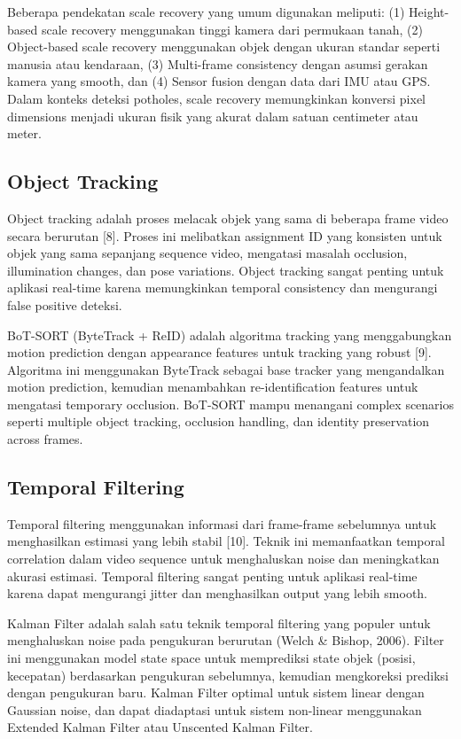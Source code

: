 \documentclass[12pt,a4paper]{report}
\begin{document}
Beberapa pendekatan scale recovery yang umum digunakan meliputi: (1) Height-based scale recovery menggunakan tinggi kamera dari permukaan tanah, (2) Object-based scale recovery menggunakan objek dengan ukuran standar seperti manusia atau kendaraan, (3) Multi-frame consistency dengan asumsi gerakan kamera yang smooth, dan (4) Sensor fusion dengan data dari IMU atau GPS. Dalam konteks deteksi potholes, scale recovery memungkinkan konversi pixel dimensions menjadi ukuran fisik yang akurat dalam satuan centimeter atau meter.

\subsection{Object Tracking}

Object tracking adalah proses melacak objek yang sama di beberapa frame video secara berurutan [8]. Proses ini melibatkan assignment ID yang konsisten untuk objek yang sama sepanjang sequence video, mengatasi masalah occlusion, illumination changes, dan pose variations. Object tracking sangat penting untuk aplikasi real-time karena memungkinkan temporal consistency dan mengurangi false positive deteksi.

BoT-SORT (ByteTrack + ReID) adalah algoritma tracking yang menggabungkan motion prediction dengan appearance features untuk tracking yang robust [9]. Algoritma ini menggunakan ByteTrack sebagai base tracker yang mengandalkan motion prediction, kemudian menambahkan re-identification features untuk mengatasi temporary occlusion. BoT-SORT mampu menangani complex scenarios seperti multiple object tracking, occlusion handling, dan identity preservation across frames.

\subsection{Temporal Filtering}

Temporal filtering menggunakan informasi dari frame-frame sebelumnya untuk menghasilkan estimasi yang lebih stabil [10]. Teknik ini memanfaatkan temporal correlation dalam video sequence untuk menghaluskan noise dan meningkatkan akurasi estimasi. Temporal filtering sangat penting untuk aplikasi real-time karena dapat mengurangi jitter dan menghasilkan output yang lebih smooth.

Kalman Filter adalah salah satu teknik temporal filtering yang populer untuk menghaluskan noise pada pengukuran berurutan (Welch \& Bishop, 2006). Filter ini menggunakan model state space untuk memprediksi state objek (posisi, kecepatan) berdasarkan pengukuran sebelumnya, kemudian mengkoreksi prediksi dengan pengukuran baru. Kalman Filter optimal untuk sistem linear dengan Gaussian noise, dan dapat diadaptasi untuk sistem non-linear menggunakan Extended Kalman Filter atau Unscented Kalman Filter.
\end{document}

